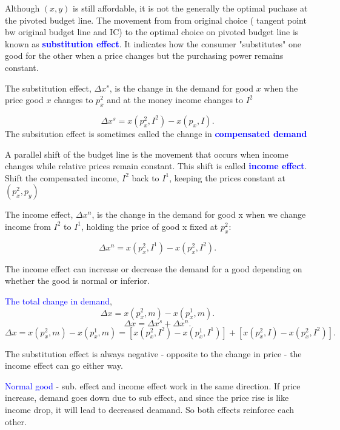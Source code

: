 \documentclass{tufte-handout}
\begin{document}
Although $(x,y)$ is still affordable, it is not the generally the optimal puchase at the pivoted budget line. The movement from from original choice ( tangent point bw original budget line and IC) to the optimal choice on pivoted budget line is known as \textcolor{blue}{\textbf{substitution effect}}. It indicates how the consumer "substitutes" one good for the other when a price changes but the purchasing power remains constant. 

The substitution effect, $\Delta x^s$, is the change in the demand for good  $x$ when the price  good  $x$ changes to  $p_x^2$ and at the money income changes to  $I^2$


\[
\Delta x^s =  x(p_x^2,I^2) - x(p_x,I)
.\] 
The subsitution effect is sometimes called the change in \textcolor{blue}{\textbf{compensated demand}}


A parallel shift of the budget line is the movement that occurs when income changes while relative prices remain constant. This shift is called \textcolor{blue}{\textbf{income effect}}. Shift the compensated income,  $I^2$ back to  $I^1$, keeping the prices constant at  $(p_x^2, p_y)$

The income effect, $\Delta x^n$, is the change in the demand for good x when we change income from  $I^2$ to $I^1$, holding the price of good x fixed at  $p_x^2$:

\[
\Delta x^n = x(p_x^2,I^1) - x(p_x^2,I^2)
.\] 

The income effect can increase or decrease the demand for a good depending on whether the good is normal or inferior.
   




\textcolor{blue}{The total change in demand},
\[ \Delta x = x(p_x^2,m) - x(p_x^1, m) .\]
\[ \Delta x = \Delta x^s + \Delta x^n  .\] 
\[ \Delta x =  x(p_x^2,m) - x(p_x^1, m)   =   [x(p_x^2,I^2) - x(p_x^1,I^1)] + [x(p_x^2,I) - x(p_x^2,I^2)] .\]
\marginnote{ \textcolor{blue}{Slutsky Identity}}

The substitution effect is always negative - opposite to the change in price - the income effect can go either way.





\textbullet \textcolor{blue}{Normal good} - sub. effect and income effect work in the same direction. If price increase, demand goes down due to sub effect, and since the price rise is like income drop, it will lead to decreased deamand. So both effects reinforce each other. 
\end{document}
